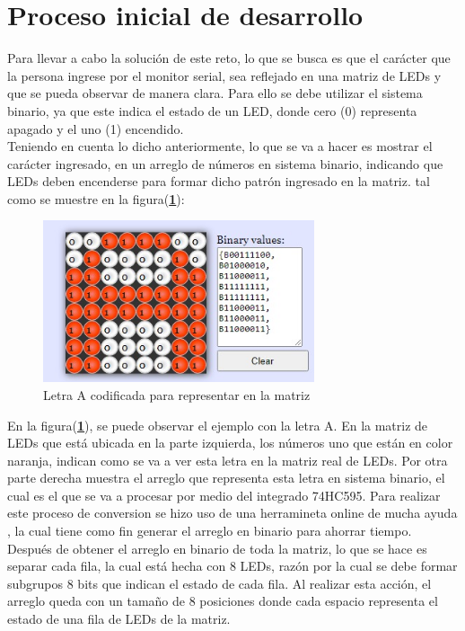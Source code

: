 \documentclass{article}
\begin{document}
\section{Proceso inicial de desarrollo} \label{desarrollo}
Para llevar a cabo la solución de este reto, lo que se busca es que el carácter que la persona ingrese por el monitor serial, sea reflejado en una matriz de LEDs y que se pueda observar de manera clara. Para ello se debe utilizar el sistema binario, ya que este indica el estado de un LED, donde cero (0) representa apagado y el uno (1) encendido.\\

Teniendo en cuenta lo dicho anteriormente, lo que se va a hacer es mostrar el carácter ingresado, en un arreglo de números en  sistema binario, indicando que LEDs deben encenderse para formar dicho patrón ingresado en la matriz. tal como se muestre en la figura(\textbf{\ref{A}}):


    \begin{figure}[h]
    \includegraphics[width=8cm]{A.jpeg}
    \centering
    \caption{Letra A codificada para representar en la matriz}
    \label{A}
    \end{figure}

En la figura(\textbf{\ref{A}}), se puede observar el ejemplo con la letra A. En la matriz de LEDs que está ubicada en la parte izquierda, los números uno que están en color naranja, indican como se va a ver esta letra en la matriz real de LEDs. Por otra parte derecha muestra el arreglo que representa esta letra en sistema binario, el cual es el que se va a procesar por medio del integrado 74HC595. Para realizar este proceso de conversion se hizo uso de una herramineta online de mucha ayuda \cite{riyas}, la cual tiene como fin generar el arreglo en binario para ahorrar tiempo.\\

Después de obtener el arreglo en binario de toda la matriz, lo que se hace es separar cada fila, la cual está hecha con 8 LEDs, razón por la cual se debe formar subgrupos 8 bits  que indican el estado de cada fila. Al realizar esta acción, el arreglo queda con un tamaño de 8 posiciones donde cada espacio representa el estado de una fila de LEDs de la matriz.\\
\end{document}
